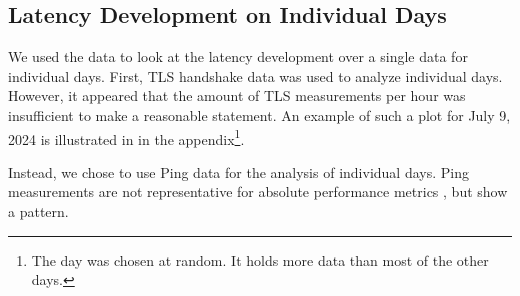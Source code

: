 \subsection{Latency Development on Individual Days} \label{sec:latency-individual-days}

We used the data to look at the latency development over a single data for
individual days. First, TLS handshake data was used to analyze individual days. However,
it appeared that the amount of TLS measurements per hour was insufficient to
make a reasonable statement. An example of such a plot for July 9, 2024 is
illustrated in  in the
appendix\footnote{The day was chosen at random. It holds more data than most of
	the other days.}.

Instead, we chose to use Ping data for the analysis of individual days. Ping
measurements are not representative for absolute performance metrics
\cite{DBLP:conf/imc/PelsserCVB13}, but show a pattern.

